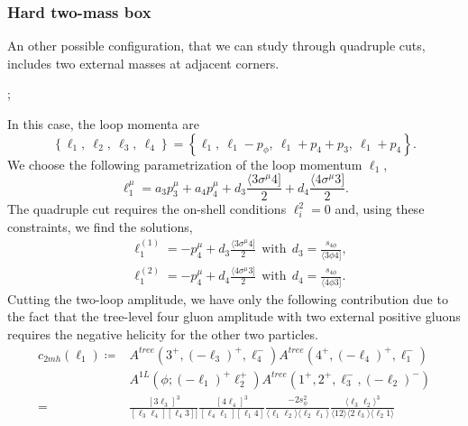 \subsubsection{Hard two-mass box}
An other possible configuration, that we can study through quadruple cuts, includes two external masses at adjacent corners.
\begin{center}
;
\end{center}
In this case, the loop momenta are
$$
	\left\{\ell_1,\ \ell_2,\ \ell_3,\ \ell_4\right\}=\left\{\ell_1,\ \ell_1-p_\phi,\ \ell_1+p_4+p_3,\ \ell_1+p_4\right\}.
$$
We choose the following parametrization of the loop momentum $\ell_1$,
$$
	\ell_1^\mu=a_3 p_3^\mu+a_4 p_4^\mu +d_3 \frac{\langle 3 \sigma^\mu 4]}{2}+d_4 \frac{\langle 4 \sigma^\mu 3]}{2}.
$$
The quadruple cut requires the on-shell conditions $\ell_i^2=0$ and, using these constraints, we find the solutions,
\begin{align}
	&\ell_1^{(1)}=-p_4^\mu +d_3\frac{\langle3\sigma^\mu4]}{2} \ \ \text{with} \ \ d_3=\frac{s_{4\phi}}{\langle 3\phi4]}, \label{eq:sol1h}\\
	&\ell_1^{(2)}=-p_4^\mu +d_4\frac{\langle4\sigma^\mu3]}{2} \ \ \text{with} \ \ d_4=\frac{s_{4\phi}}{\langle4\phi 3]}.
\end{align}
Cutting the two-loop amplitude, we have only the following contribution due to the fact that the tree-level four gluon amplitude with two external positive gluons requires the negative helicity for the other two particles.
\begin{align*}
	c_{2mh}(\ell_1)\coloneqq&A^{tree}(3^+,(-\ell_3)^+,\ell_4^-) A^{tree}(4^+,(-\ell_4)^+, \ell_1^-) \\&A^{1L}(\phi;(-\ell_1)^+\ell_2^+)A^{tree}(1^+,2^+,\ell_3^-,(-\ell_2)^-)\\
	=&\frac{[3\ell_3]^3}{[\ell_3\ell_4][\ell_4 3]]}\frac{[4\ell_4]^3}{[\ell_4\ell_1][\ell_1 4]}\frac{-2s_\phi^2}{\langle \ell_1\ell_2\rangle\langle\ell_2\ell_1\rangle}\frac{\langle \ell_3\ell_2\rangle^3}{\langle 12 \rangle\langle 2\ell_3 \rangle \langle \ell_2 1 \rangle}
\end{align*}
